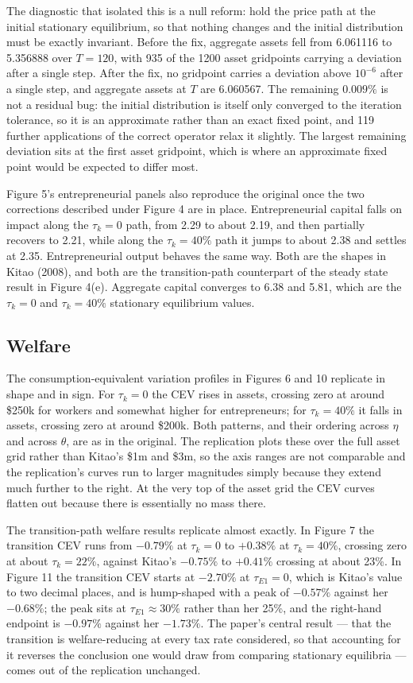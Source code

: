 \documentclass[11pt,fleqn]{article}
\begin{document}
The diagnostic that isolated this is a null reform: hold the price path at the initial stationary equilibrium, so that nothing changes and the initial distribution must be exactly invariant. Before the fix, aggregate assets fell from 6.061116 to 5.356888 over $T=120$, with 935 of the 1200 asset gridpoints carrying a deviation after a single step. After the fix, no gridpoint carries a deviation above $10^{-6}$ after a single step, and aggregate assets at $T$ are 6.060567. The remaining $0.009\%$ is not a residual bug: the initial distribution is itself only converged to the iteration tolerance, so it is an approximate rather than an exact fixed point, and 119 further applications of the correct operator relax it slightly. The largest remaining deviation sits at the first asset gridpoint, which is where an approximate fixed point would be expected to differ most.

Figure 5's entrepreneurial panels also reproduce the original once the two corrections described under Figure 4 are in place. Entrepreneurial capital falls on impact along the $\tau_k=0$ path, from 2.29 to about 2.19, and then partially recovers to 2.21, while along the $\tau_k=40\%$ path it jumps to about 2.38 and settles at 2.35. Entrepreneurial output behaves the same way. Both are the shapes in Kitao (2008), and both are the transition-path counterpart of the steady state result in Figure 4(e). Aggregate capital converges to 6.38 and 5.81, which are the $\tau_k=0$ and $\tau_k=40\%$ stationary equilibrium values.

\subsection*{Welfare}
The consumption-equivalent variation profiles in Figures 6 and 10 replicate in shape and in sign. For $\tau_k=0$ the CEV rises in assets, crossing zero at around \$250k for workers and somewhat higher for entrepreneurs; for $\tau_k=40\%$ it falls in assets, crossing zero at around \$200k. Both patterns, and their ordering across $\eta$ and across $\theta$, are as in the original. The replication plots these over the full asset grid rather than Kitao's \$1m and \$3m, so the axis ranges are not comparable and the replication's curves run to larger magnitudes simply because they extend much further to the right. At the very top of the asset grid the CEV curves flatten out because there is essentially no mass there.

The transition-path welfare results replicate almost exactly. In Figure 7 the transition CEV runs from $-0.79\%$ at $\tau_k=0$ to $+0.38\%$ at $\tau_k=40\%$, crossing zero at about $\tau_k=22\%$, against Kitao's $-0.75\%$ to $+0.41\%$ crossing at about 23\%. In Figure 11 the transition CEV starts at $-2.70\%$ at $\tau_{E1}=0$, which is Kitao's value to two decimal places, and is hump-shaped with a peak of $-0.57\%$ against her $-0.68\%$; the peak sits at $\tau_{E1}\approx 30\%$ rather than her 25\%, and the right-hand endpoint is $-0.97\%$ against her $-1.73\%$. The paper's central result --- that the transition is welfare-reducing at every tax rate considered, so that accounting for it reverses the conclusion one would draw from comparing stationary equilibria --- comes out of the replication unchanged.
\end{document}
